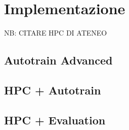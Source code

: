 \chapter{Implementazione}\label{chapter:implementazione}
NB: CITARE HPC DI ATENEO

\section{Autotrain Advanced}\label{sec:autotrain_advanced}

\section{HPC + Autotrain}\label{sec:hpc_unipr_autotrain}

\section{HPC + Evaluation}\label{sec:hpc_unipr_evaluation}
